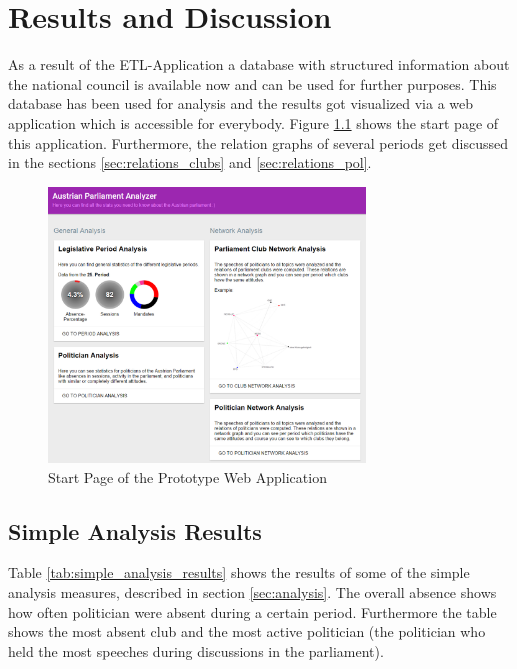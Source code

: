 

\chapter{Results and Discussion}
\label{chap:evaluation}

As a result of the ETL-Application a database with structured information about the national council is available now and can be used for further purposes. This database has been used for analysis and the results got visualized via a web application which is accessible for everybody. Figure \ref{fig:start_page_prototype} shows the start page of this application. Furthermore, the relation graphs of several periods get discussed in the sections \ref{sec:relations_clubs} and \ref{sec:relations_pol}. 

\begin{figure}
	\center
	\includegraphics[width=0.75\textwidth]{imgs/result_start_page}
	\caption{Start Page of the Prototype Web Application}
	\label{fig:start_page_prototype}
\end{figure}

\section{Simple Analysis Results}
Table \ref{tab:simple_analysis_results} shows the results of some of the simple analysis measures, described in section \ref{sec:analysis}. The overall absence shows how often politician were absent during a certain period. Furthermore the table shows the most absent club and the most active politician (the politician who held the most speeches during discussions in the parliament).

